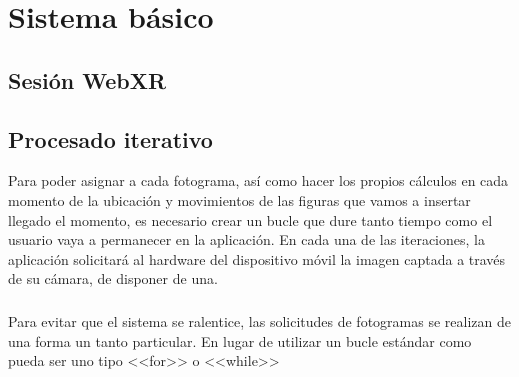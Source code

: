 \documentclass{subfiles}
\begin{document}
  \chapter{Sistema básico}
  \label{chap:2}

        \section{Sesión WebXR}
        \label{sec:2.1}
        
        
        \section{Procesado iterativo}
        \label{sec:2.x}

        Para poder asignar a cada fotograma, así como hacer los propios cálculos en cada momento de la ubicación y movimientos de las figuras que vamos a insertar llegado el momento, es necesario crear un bucle que dure tanto tiempo como el usuario vaya a permanecer en la aplicación. En cada una de las iteraciones, la aplicación solicitará al hardware del dispositivo móvil la imagen captada a través de su cámara, de disponer de una.

        \paragraph{}
        Para evitar que el sistema se ralentice, las solicitudes de fotogramas se realizan de una forma un tanto particular. En lugar de utilizar un bucle estándar como pueda ser uno tipo <<for>> o <<while>>
\end{document}
